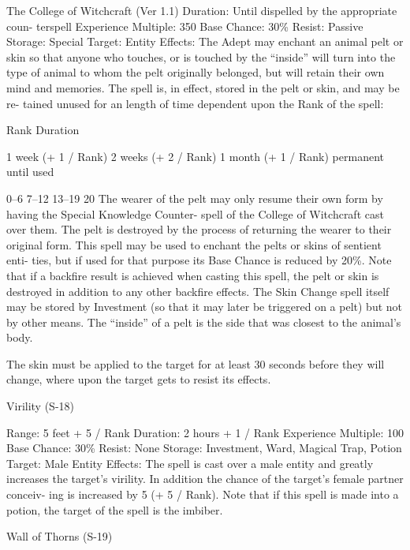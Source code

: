 \begin{Chapter}{The College of Witchcraft (Ver 1.1)}
Duration: Until dispelled by the appropriate coun-
terspell 
Experience Multiple: 350 
Base Chance: 30\% 
Resist: Passive 
Storage: Special 
Target: Entity 
Effects:  The  Adept  may  enchant  an  animal  pelt  or 
skin so that anyone  who touches, or  is touched by 
the  “inside”  will  turn  into  the  type  of  animal  to 
whom  the  pelt  originally  belonged,  but  will  retain 
their  own  mind  and  memories.  The  spell  is,  in 
effect,  stored  in  the  pelt  or  skin,  and  may  be  re-
tained unused for an length of time dependent upon 
the Rank of the spell: 

Rank  Duration 

1 week (+ 1 / Rank) 
2 weeks (+ 2 / Rank) 
1 month (+ 1 / Rank) 
permanent until used 

0–6 
7–12 
13–19 
20 
The wearer of the pelt may only resume their own 
form  by  having  the  Special  Knowledge  Counter-
spell  of  the  College  of  Witchcraft  cast  over  them. 
The  pelt  is  destroyed  by  the  process  of  returning 
the wearer to their original form. This spell may be 
used  to  enchant  the  pelts  or  skins  of  sentient  enti-
ties, but if used for that purpose its Base Chance is 
reduced  by  20\%.  Note  that  if  a  backfire  result  is 
achieved when casting this spell, the pelt or skin is 
destroyed in addition to any other backfire effects. 
The  Skin  Change  spell  itself  may  be  stored  by 
Investment  (so  that  it  may  later  be  triggered  on  a 
pelt) but not by other means. The “inside” of a pelt 
is the side that was closest to the animal’s body. 

The  skin  must  be  applied  to  the  target  for  at  least 
30  seconds  before  they  will  change,  where  upon 
the target gets to resist its effects. 

Virility (S-18) 

Range: 5 feet + 5 / Rank 
Duration: 2 hours + 1 / Rank 
Experience Multiple: 100 
Base Chance: 30\% 
Resist: None 
Storage: Investment, Ward, Magical Trap, Potion 
Target: Male Entity 
Effects:  The  spell  is  cast  over  a  male  entity  and 
greatly  increases  the  target’s  virility.  In  addition 
the  chance  of  the  target’s  female  partner  conceiv-
ing is increased by 5 (+ 5 / Rank). Note that if this 
spell is made into a potion, the target of the spell is 
the imbiber. 

Wall of Thorns (S-19) 


\end{Chapter}
